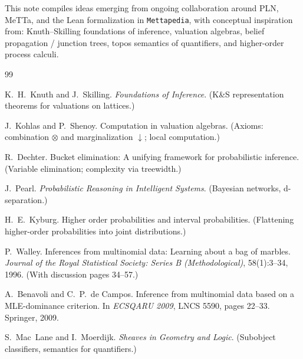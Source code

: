 \documentclass[11pt]{article}
\newcommand{\tensor}{\mathbin{\otimes}}  %
\begin{document}
This note compiles ideas emerging from ongoing collaboration around PLN, MeTTa, and the Lean formalization
in \texttt{Mettapedia}, with conceptual inspiration from:
Knuth--Skilling foundations of inference, valuation algebras, belief propagation / junction trees,
topos semantics of quantifiers, and higher-order process calculi.

\begin{thebibliography}{99}\small

K.\ H.\ Knuth and J.\ Skilling.
\newblock \emph{Foundations of Inference}.
\newblock (K\&S representation theorems for valuations on lattices.)

J.\ Kohlas and P.\ Shenoy.
\newblock Computation in valuation algebras.
\newblock (Axioms: combination $\tensor$ and marginalization $\downarrow$; local computation.)

R.\ Dechter.
\newblock Bucket elimination: A unifying framework for probabilistic inference.
\newblock (Variable elimination; complexity via treewidth.)

J.\ Pearl.
\newblock \emph{Probabilistic Reasoning in Intelligent Systems}.
\newblock (Bayesian networks, d-separation.)

H.\ E.\ Kyburg.
\newblock Higher order probabilities and interval probabilities.
\newblock (Flattening higher-order probabilities into joint distributions.)

P.\ Walley.
\newblock Inferences from multinomial data: Learning about a bag of marbles.
\newblock \emph{Journal of the Royal Statistical Society: Series B (Methodological)},
58(1):3--34, 1996. (With discussion pages 34--57.)

A.\ Benavoli and C.\ P.\ de Campos.
\newblock Inference from multinomial data based on a MLE-dominance criterion.
\newblock In \emph{ECSQARU 2009}, LNCS 5590, pages 22--33. Springer, 2009.

S.\ Mac~Lane and I.\ Moerdijk.
\newblock \emph{Sheaves in Geometry and Logic}.
\newblock (Subobject classifiers, semantics for quantifiers.)

\end{thebibliography}
\end{document}
